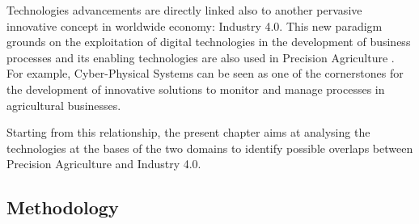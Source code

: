 \documentclass[]{book}
\begin{document}
Technologies advancements are directly linked also to another pervasive
innovative concept in worldwide economy: Industry 4.0. This new paradigm
grounds on the exploitation of digital technologies in the development
of business processes and its enabling technologies are also used in
Precision Agriculture . For example, Cyber-Physical Systems can be seen
as one of the cornerstones for the development of innovative solutions
to monitor and manage processes in agricultural businesses.

Starting from this relationship, the present chapter aims at analysing
the technologies at the bases of the two domains to identify possible
overlaps between Precision Agriculture and Industry 4.0.

\subsection{Methodology}\label{methodology-5}
\end{document}
